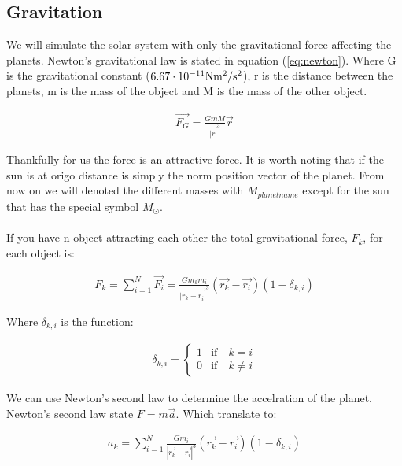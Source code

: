 \subsection{Gravitation}

We will simulate the solar system with only the gravitational force affecting the planets.  Newton's gravitational law is stated in equation (\ref{eq:newton}). Where G is the gravitational constant ($6.67 \cdot 10^{-11} \rm{Nm^2/s^2}$), r is the distance between the planets, m is the mass of the object and M is the mass of the other object.

\begin{align}
	\vec{F_G}  =\frac{GmM}{\vec{|r|}^3}\vec{r}
	\label{eq:newton}
\end{align}

Thankfully for us the force is an attractive force. It is worth noting that if the sun is at origo distance is simply the norm position vector of the planet. From now on we will denoted the different masses with $M_{planet name}$ except for the sun that has the special symbol $M_{\odot}$. 
\\
\\
If you have n object attracting each other the total gravitational force, $F_k$, for each object is: 


\begin{align}
	F_k = 
	\sum_{i = 1}^{N}
	\vec{F_i}  
	=
	\frac{Gm_km_i}
	{\vec{|r_k - r_i|}^3}
	(\vec{r_k} - \vec{r_i})
	(1 - \delta_{k,i})
	\label{eq:newton_all}
\end{align}

Where $\delta_{k,i}$ is the function:

\begin{align*}
	\delta_{k,i} = \left\{\begin{matrix}
					1 & \text{if} \quad k =  i\\
					0 & \text{if} \quad k \neq i 
					\end{matrix}\right.
\end{align*}



We can use Newton's second law to determine the accelration of the planet. Newton's second law state $F = m\vec{a}$. Which translate to:

\begin{align}
	a_k
	=
	\sum_{i = 1}^{N}
	\frac{Gm_i}
	{|\vec{r_k} - \vec{r_i}|^3}
	(\vec{r_k} - \vec{r_i})
	(1 - \delta_{k,i})
	\label{eq:acceleration_all}
\end{align}



